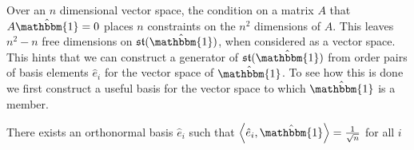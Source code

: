 Over an $n$ dimensional vector space, the condition on a matrix $A$ that $A \hat{\mathbbm{1}} = 0$
places $n$ constraints on the $n^2$ dimensions of $A$. This leaves $n^2 - n$ 
free dimensions on $\mathfrak{st}(\hat{\mathbbm{1}})$, when considered as a
vector space. This hints that we can construct a generator of $\mathfrak{st}(\hat{\mathbbm{1}})$
from order pairs of basis elements $\hat{e}_i$ for the vector space of $\hat{\mathbbm{1}}$.
To see how this is done we first construct a useful basis for the vector space
to which $\hat{\mathbbm{1}}$ is a member.

\begin{lemma}
	There exists an orthonormal basis $\hat{e}_i$ such that $\left\langle \hat{e}_i, \hat{\mathbbm{1}} \right\rangle = \frac{1}{\sqrt{n}}$
	for all $i$
\end{lemma}

